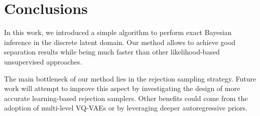 \documentclass[a4paper]{article}
\begin{document}
 \section{Conclusions}
\label{sec:conclusion}
In this work, we introduced a simple algorithm to perform exact Bayesian inference in the discrete latent domain.
Our method allows to achieve good separation results while being much faster than other likelihood-based unsupervised approaches.


The main bottleneck of our method lies in the rejection sampling strategy. Future work will attempt to improve this aspect by investigating the design of more accurate learning-based rejection samplers. Other benefits could come from the adoption of multi-level VQ-VAEs \cite{dhariwal:2020} or by leveraging deeper autoregressive priors.

%
 



\end{document}
